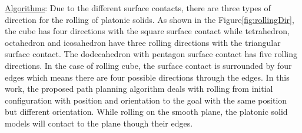 \clearpage
\newpage
\noindent\uline{Algorithms}:
Due to the different surface contacts, there are three types of direction for the rolling of platonic solids. As shown in the Figure\ref{fig:rollingDir}, the cube has four directions with the square surface contact while tetrahedron, octahedron and icosahedron have three rolling directions with the triangular surface contact. The dodecahedron with pentagon surface contact has five rolling directions. In the case of rolling cube, the surface contact is surrounded by four edges which means there are four possible directions through the edges. In this work, the proposed path planning algorithm deals with rolling from initial configuration with position and orientation to the goal with the same position but different orientation. While rolling on the smooth plane, the platonic solid models will contact to the plane though their edges.\\

